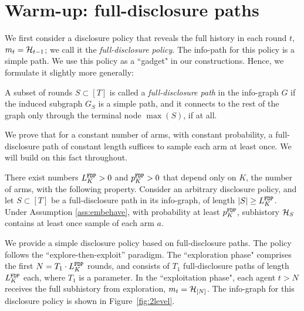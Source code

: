 \section{Warm-up: full-disclosure paths}
\label{sec:warmup}
We first consider a disclosure policy that reveals the full history in each round $t$, \ie $m_t=\mathcal{H}_{t-1}$; we call it the \emph{full-disclosure policy}. The info-path for this policy is a simple path. We use this policy as a ``gadget" in our constructions. Hence, we formulate it slightly more generally:

\begin{definition}
A subset of rounds $S\subset [T]$ is called a \emph{full-disclosure path} in the  info-graph $G$ if the induced subgraph $G_S$ is a simple path, and it connects to the rest of the graph only through the terminal node $\max(S)$, if at all.
\end{definition}

We prove that for a constant number of arms, with constant probability, a full-disclosure path of constant length suffices to sample each arm at least once. We will build on this fact throughout.

\begin{lemma}\label{lem:greedy}
There exist numbers $L^\mathtt{FDP}_K>0$ and $p^\mathtt{FDP}_K>0$ that depend only on $K$, the number of arms, with the following property. Consider an arbitrary disclosure policy, and let $S\subset [T]$ be a full-disclosure path in its info-graph, of length $|S|\geq L^\mathtt{FDP}_K$. Under Assumption \ref{ass:embehave}, with probability at least $p^\mathtt{FDP}_K$, subhistory $\mathcal{H}_{S}$ contains at least once sample of each arm $a$.
\end{lemma}


We provide a simple disclosure policy based on full-disclosure paths. The policy follows the ``explore-then-exploit'' paradigm. The ``exploration phase" comprises the first $N = T_1\cdot L^\mathtt{FDP}_K$ rounds, and consists of $T_1$ full-disclosure paths of length $L^\mathtt{FDP}_K$ each, where $T_1$ is a parameter. In the ``exploitation phase", each agent $t>N$ receives the full subhistory from exploration, \ie $m_t = \mathcal{H}_{[N]}$. The info-graph for this disclosure policy is shown in Figure~\ref{fig:2level}.

